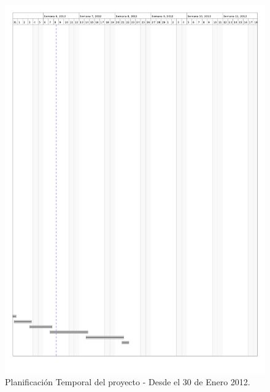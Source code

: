 \documentclass[a4paper,12pt]{article}
\begin{document}
\pagebreak
\begin{figure}[H]
\begin{center}
\includegraphics[width=16.5cm]{planificacion_graphvisualx_7.png}
\caption{Planificación Temporal del proyecto - Desde el 30 de Enero 2012.}
\end{center}
\end{figure}
\end{document}

